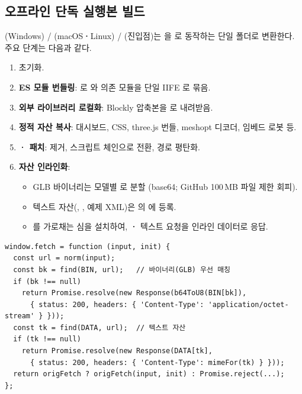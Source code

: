 \subsection{오프라인 단독 실행본 빌드}

(Windows) / (macOS\textbf{·}Linux) /
(진입점)는 을 로 동작하는 단일
 폴더로 변환한다. 주요 단계는 다음과 같다.

\begin{enumerate}
  \item {} 초기화.
  \item \textbf{ES 모듈 번들링}: 로 와 의존 모듈을
        단일 IIFE 로 묶음.
  \item \textbf{외부 라이브러리 로컬화}: Blockly 압축본을 로 내려받음.
  \item \textbf{정적 자산 복사}: 대시보드, CSS, three.js 번들, meshopt 디코더,
        임베드 로봇 등.
  \item \textbf{\textbf{·} 패치}:
         제거,  스크립트 체인으로 전환,
        경로 평탄화.
  \item \textbf{자산 인라인화}:
    \begin{itemize}
      \item GLB 바이너리는 모델별 로 분할
            (base64; GitHub 100\,MB 파일 제한 회피).
      \item 텍스트 자산(, , 예제 XML)은
            의 에 등록.
      \item {}를 가로채는 심을 설치하여, \textbf{·}
            텍스트 요청을 인라인 데이터로 응답.
    \end{itemize}
\end{enumerate}

\begin{verbatim}
window.fetch = function (input, init) {
  const url = norm(input);
  const bk = find(BIN, url);   // 바이너리(GLB) 우선 매칭
  if (bk !== null)
    return Promise.resolve(new Response(b64ToU8(BIN[bk]),
      { status: 200, headers: { 'Content-Type': 'application/octet-stream' } }));
  const tk = find(DATA, url);  // 텍스트 자산
  if (tk !== null)
    return Promise.resolve(new Response(DATA[tk],
      { status: 200, headers: { 'Content-Type': mimeFor(tk) } }));
  return origFetch ? origFetch(input, init) : Promise.reject(...);
};
\end{verbatim}

